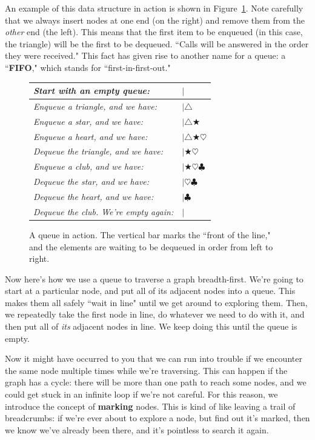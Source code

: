 An example of this data structure in action is shown in Figure~\ref{queue}.
Note carefully that we always insert nodes at one end (on the right) and
remove them from the \textit{other} end (the left). This means that the
first item to be enqueued (in this case, the triangle) will be the first to
be dequeued. ``Calls will be answered in the order they were received."
This fact has given rise to another name for a queue: a ``\textbf{FIFO},"
which stands for ``first-in-first-out."

\afterpage{\clearpage}

\begin{figure}[ht]
\centering
\begin{tabular}{l l}
\textit{Start with an empty queue:} & $|$ \\
\hline
\textit{Enqueue a triangle, and we have:} & $|\triangle$ \\
\hline
\textit{Enqueue a star, and we have:} & $|\triangle \bigstar$ \\
\hline
\textit{Enqueue a heart, and we have:} & $|\triangle \bigstar \heartsuit$ \\
\hline
\textit{Dequeue the triangle, and we have:} & $|\bigstar \heartsuit$ \\
\hline
\textit{Enqueue a club, and we have:} & $|\bigstar \heartsuit \clubsuit$ \\
\hline
\textit{Dequeue the star, and we have:} & $|\heartsuit \clubsuit$ \\
\hline
\textit{Dequeue the heart, and we have:} & $|\clubsuit$ \\
\hline
\textit{Dequeue the club. We're empty again:} & $|$ \\
\end{tabular}
\caption{A queue in action. The vertical bar marks the ``front of the
line," and the elements are waiting to be dequeued in order from left to
right.}
\label{queue}
\end{figure}

Now here's how we use a queue to traverse a graph breadth-first. We're
going to start at a particular node, and put all of its adjacent nodes into
a queue. This makes them all safely ``wait in line" until we get around to
exploring them. Then, we repeatedly take the first node in line, do
whatever we need to do with it, and then put all of \textit{its} adjacent
nodes in line. We keep doing this until the queue is empty.

Now it might have occurred to you that we can run into trouble if we
encounter the same node multiple times while we're traversing. This can
happen if the graph has a cycle: there will be more than one path to reach
some nodes, and we could get stuck in an infinite loop if we're not
careful. For this reason, we introduce the concept of \textbf{marking} 
nodes. This is kind of like leaving a trail of breadcrumbs: if we're ever
about to explore a node, but find out it's marked, then we know we've
already been there, and it's pointless to search it again.

